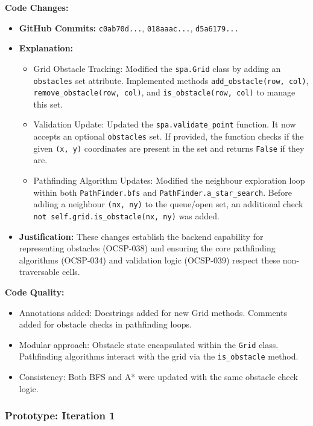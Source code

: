 \textbf{Code Changes:}
\begin{itemize}
	\item \textbf{GitHub Commits:} \verb|c0ab70d...|, \verb|018aaac...|, \verb|d5a6179...|
	\item \textbf{Explanation:}
	\begin{itemize}
	    \item Grid Obstacle Tracking: Modified the \verb|spa.Grid| class by adding an \verb|obstacles| set attribute. Implemented methods \verb|add_obstacle(row, col)|, \verb|remove_obstacle(row, col)|, and \verb|is_obstacle(row, col)| to manage this set.
	    \item Validation Update: Updated the \verb|spa.validate_point| function. It now accepts an optional \verb|obstacles| set. If provided, the function checks if the given \verb|(x, y)| coordinates are present in the set and returns \verb|False| if they are.
		\item Pathfinding Algorithm Updates: Modified the neighbour exploration loop within both \verb|PathFinder.bfs| and \verb|PathFinder.a_star_search|. Before adding a neighbour \verb|(nx, ny)| to the queue/open set, an additional check \verb|not self.grid.is_obstacle(nx, ny)| was added.
	\end{itemize}
	\item \textbf{Justification:} These changes establish the backend capability for representing obstacles (OCSP-038) and ensuring the core pathfinding algorithms (OCSP-034) and validation logic (OCSP-039) respect these non-traversable cells.
\end{itemize}

\textbf{Code Quality:}
\begin{itemize}
	\item Annotations added: Docstrings added for new Grid methods. Comments added for obstacle checks in pathfinding loops.
	\item Modular approach: Obstacle state encapsulated within the \verb|Grid| class. Pathfinding algorithms interact with the grid via the \verb|is_obstacle| method.
	\item Consistency: Both BFS and A* were updated with the same obstacle check logic.
\end{itemize}

\subsubsection*{Prototype: Iteration 1}




